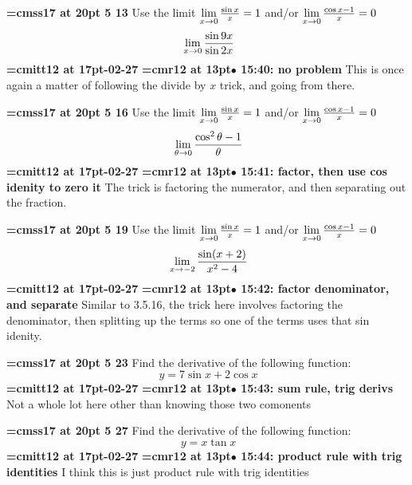 {\medskip\noindent\bf\font\titlefont=cmss17 at 20pt 5 13}\medskip
Use the limit
$\lim\limits_{x \to 0} {\sin x \over x} = 1$
and/or
$\lim\limits_{x \to 0} {\cos x - 1 \over x} = 0$
$$\
\lim_{x \to 0} {\sin 9x \over \sin 2x}
$$
{\medskip\noindent\bf\font\titlefont=cmitt12 at 17pt-02-27}\medskip
{\smallskip\noindent\bf\font\titlefont=cmr12 at 13pt\titlefont $\bullet$ 15:40: no problem}\smallskip
This is once again a matter of following the divide by $x$ trick, and going from there.
\par

{\medskip\noindent\bf\font\titlefont=cmss17 at 20pt 5 16}\medskip
Use the limit
$\lim\limits_{x \to 0} {\sin x \over x} = 1$
and/or
$\lim\limits_{x \to 0} {\cos x - 1 \over x} = 0$
$$\
\lim_{\theta \to 0}{\cos^2\theta - 1 \over \theta}
$$
{\medskip\noindent\bf\font\titlefont=cmitt12 at 17pt-02-27}\medskip
{\smallskip\noindent\bf\font\titlefont=cmr12 at 13pt\titlefont $\bullet$ 15:41: factor, then use cos idenity to zero it}\smallskip
The trick is factoring the numerator, and then separating out the fraction.
\par

{\medskip\noindent\bf\font\titlefont=cmss17 at 20pt 5 19}\medskip
Use the limit
$\lim\limits_{x \to 0} {\sin x \over x} = 1$
and/or
$\lim\limits_{x \to 0} {\cos x - 1 \over x} = 0$
$$\
\lim_{x \to -2}{
\sin(x + 2)
\over
x^2 - 4
}
$$
{\medskip\noindent\bf\font\titlefont=cmitt12 at 17pt-02-27}\medskip
{\smallskip\noindent\bf\font\titlefont=cmr12 at 13pt\titlefont $\bullet$ 15:42: factor denominator, and separate}\smallskip
Similar to 3.5.16, the trick here involves factoring the denominator, then splitting up the terms so one of the terms uses that sin idenity.
\par

\xrdef{node71}
{\medskip\noindent\bf\font\titlefont=cmss17 at 20pt 5 23}\medskip
Find the derivative of the following function:
$$\
y = 7\sin x + 2\cos x
$$
{\medskip\noindent\bf\font\titlefont=cmitt12 at 17pt-02-27}\medskip
{\smallskip\noindent\bf\font\titlefont=cmr12 at 13pt\titlefont $\bullet$ 15:43: sum rule, trig derivs}\smallskip
Not a whole lot here other than knowing those two comonents
\par

\xrdef{node72}
{\medskip\noindent\bf\font\titlefont=cmss17 at 20pt 5 27}\medskip
Find the derivative of the following function:
$$\
y = x \tan x
$$
{\medskip\noindent\bf\font\titlefont=cmitt12 at 17pt\titlefont 2026-02-27}\medskip
{\smallskip\noindent\bf\font\titlefont=cmr12 at 13pt\titlefont $\bullet$ 15:44: product rule with trig identities}\smallskip
I think this is just product rule with trig identities
\par

